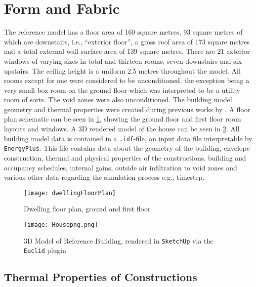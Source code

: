 \section{Form and Fabric}
The reference model has a floor area of 160 square metres, 93 square metres of which are downstairs, i.e., ``exterior floor'', a gross roof area of 173 square metres and a total external wall surface area of 139 square metres. There are 21 exterior windows of varying sizes in total and thirteen rooms, seven downstairs and six upstairs. The ceiling height is a uniform 2.5 metres throughout the model. All rooms except for one were considered to be unconditioned, the exception being a very small box room on the ground floor which was interpreted to be a utility room of sorts. The void zones were also unconditioned. The building model geometry and thermal properties were created during previous works by \citeauthor{keogh_technical_2018} \cite{keogh_technical_2018}. A floor plan schematic can be seen in \cref{fig:floorplan}, showing the ground floor and first floor room layouts and windows. A 3D rendered model of the house can be seen in \cref{fig:3dmodel}. All building model data is contained in a \texttt{.idf}-file, an input data file interpretable by \texttt{EnergyPlus}. This file contains data about the geometry of the building, envelope construction, thermal and physical properties of the constructions, building and occupancy schedules, internal gains, outside air infiltration to void zones and various other data regarding the simulation process e.g., timestep. 

\begin{figure}[htb]
    \centering
    \texttt{[image: dwellingFloorPlan]}
    \caption{Dwelling floor plan, ground and first floor}
    \label{fig:floorplan}
\end{figure}

\begin{figure}[htb]
    \centering
    \texttt{[image: Housepng.png]}
    \caption[3D Model of Reference Building]{3D Model of Reference Building, rendered in \texttt{SketchUp} via the \texttt{Euclid} plugin}
    \label{fig:3dmodel}
\end{figure}


\subsection{Thermal Properties of Constructions}


